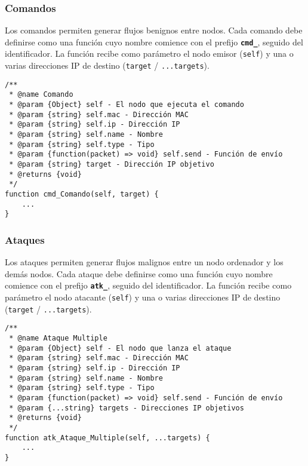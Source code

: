 \subsubsection{Comandos}
\label{subsubsec:BibliotecaExternaComandos}
Los comandos permiten generar flujos benignos entre nodos. Cada comando debe definirse como una función cuyo nombre comience con el prefijo \textbf{\texttt{cmd\_}}, seguido del identificador. La función recibe como parámetro el nodo emisor (\texttt{self}) y una o varias direcciones IP de destino (\texttt{target} / \texttt{...targets}).

\begin{verbatim}
/**
 * @name Comando
 * @param {Object} self - El nodo que ejecuta el comando
 * @param {string} self.mac - Dirección MAC
 * @param {string} self.ip - Dirección IP
 * @param {string} self.name - Nombre
 * @param {string} self.type - Tipo
 * @param {function(packet) => void} self.send - Función de envío
 * @param {string} target - Dirección IP objetivo
 * @returns {void}
 */
function cmd_Comando(self, target) {
    ...
}
\end{verbatim}

\subsubsection{Ataques}
\label{subsubsec:BibliotecaExternaAtaques}
Los ataques permiten generar flujos malignos entre un nodo ordenador y los demás nodos. Cada ataque debe definirse como una función cuyo nombre comience con el prefijo \textbf{\texttt{atk\_}}, seguido del identificador. La función recibe como parámetro el nodo atacante (\texttt{self}) y una o varias direcciones IP de destino (\texttt{target} / \texttt{...targets}).

\begin{verbatim}
/**
 * @name Ataque Multiple
 * @param {Object} self - El nodo que lanza el ataque
 * @param {string} self.mac - Dirección MAC
 * @param {string} self.ip - Dirección IP
 * @param {string} self.name - Nombre
 * @param {string} self.type - Tipo
 * @param {function(packet) => void} self.send - Función de envío
 * @param {...string} targets - Direcciones IP objetivos
 * @returns {void}
 */
function atk_Ataque_Multiple(self, ...targets) {
    ...
}
\end{verbatim}

